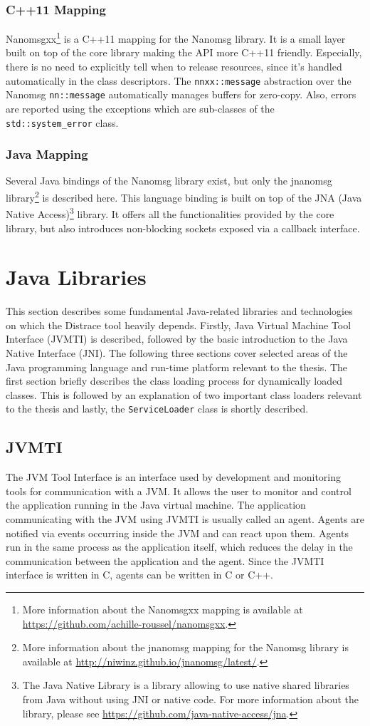 \subsubsection{C++11 Mapping}
Nanomsgxx\footnote{More information about the Nanomsgxx mapping is available at \url{https://github.com/achille-roussel/nanomsgxx}.} is a C++11 mapping for the Nanomsg library. It is a small layer built on top of the core library making the API more C++11  friendly. Especially, there is no need to explicitly tell when to release resources, since it's handled automatically in the class descriptors. The \texttt{nnxx::message} abstraction over the Nanomsg \texttt{nn::message} automatically manages buffers for zero-copy. Also, errors are reported using the exceptions which are sub-classes of the \texttt{std::system\_error} class.
\subsubsection{Java Mapping}
Several Java bindings of the Nanomsg library exist, but only the jnanomsg library\footnote{More information about the jnanomsg mapping for the Nanomsg library is available at \url{http://niwinz.github.io/jnanomsg/latest/}.}  is described here. This language binding is built on top of the JNA (Java Native Access)\footnote{The Java Native Library is a library allowing to use native shared libraries from Java without using JNI or native code. For more information about the library, please see \url{https://github.com/java-native-access/jna}.} library. It offers all the functionalities provided by the core library, but also introduces non-blocking sockets exposed via a callback interface.

\section{Java Libraries}
This section describes some fundamental Java-related libraries and technologies on which the Distrace tool heavily depends. Firstly, Java Virtual Machine Tool Interface (JVMTI) is described, followed by the basic introduction to the Java Native Interface (JNI). The following three sections cover selected areas of the Java programming language and run-time platform relevant to the thesis. The first section briefly describes the class loading process for dynamically loaded classes. This is followed by an explanation of two important class loaders relevant to the thesis and lastly, the \texttt{ServiceLoader} class is shortly described.
\subsection{JVMTI}
\label{JVMTI}
The JVM Tool Interface is an interface used by development and monitoring tools for communication with a JVM. It allows the user to monitor and control the application running in the Java virtual machine. The application communicating with the JVM using JVMTI is usually called an agent. Agents are notified via events occurring inside the JVM and can react upon them. Agents run in the same process as the application itself, which reduces the delay in the communication between the application and the agent. Since the JVMTI interface is written in C, agents can be written in C or C++. 


